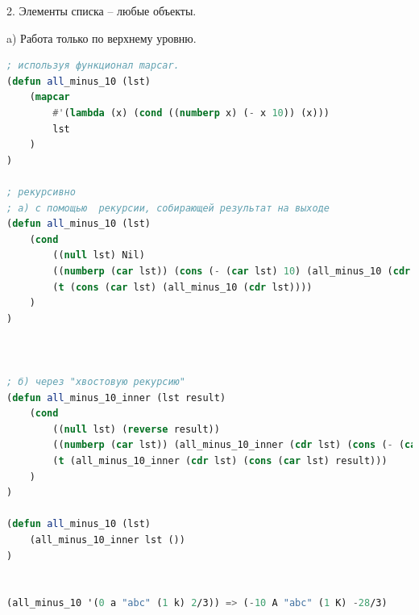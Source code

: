 \documentclass[12pt]{report}
\begin{document}
2. Элементы списка -- любые объекты.

a) Работа только по верхнему уровню. 

\begin{lstlisting}[language=Lisp]
; используя функционал mapcar.
(defun all_minus_10 (lst)
	(mapcar 
		#'(lambda (x) (cond ((numberp x) (- x 10)) (x)))
		lst
	)
)

; рекурсивно
; а) с помощью  рекурсии, собирающей результат на выходе
(defun all_minus_10 (lst)
	(cond 
		((null lst) Nil)
		((numberp (car lst)) (cons (- (car lst) 10) (all_minus_10 (cdr lst))))
		(t (cons (car lst) (all_minus_10 (cdr lst))))
	)
)	



; б) через "хвостовую рекурсию" 
(defun all_minus_10_inner (lst result)
	(cond 
		((null lst) (reverse result))
		((numberp (car lst)) (all_minus_10_inner (cdr lst) (cons (- (car lst) 10) result)))
		(t (all_minus_10_inner (cdr lst) (cons (car lst) result)))
	)
)

(defun all_minus_10 (lst) 
	(all_minus_10_inner lst ())
)


(all_minus_10 '(0 a "abc" (1 k) 2/3)) => (-10 A "abc" (1 K) -28/3)
\end{lstlisting}
\end{document}
